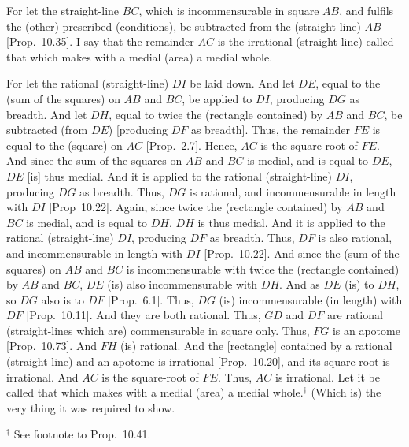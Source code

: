 \begin{Parallel}{}{}
{\epsfysize=1.7in 
\centerline{}

For let the straight-line $BC$, which is incommensurable in square
$AB$, and fulfils the (other) prescribed (conditions), be subtracted from the
(straight-line) $AB$ [Prop.~10.35].  I say that the remainder $AC$ is the irrational (straight-line) called  that which makes with a medial (area) a medial whole.

For let the rational (straight-line) $DI$ be laid down. And let $DE$, equal to
the (sum of the squares) on $AB$ and $BC$, be applied to $DI$,
producing $DG$ as breadth. And let $DH$, equal to twice the (rectangle
contained) by $AB$ and $BC$, be subtracted (from $DE$) [producing
$DF$ as breadth]. Thus, the remainder $FE$ is equal to the (square) on 
$AC$ [Prop.~2.7]. Hence, $AC$ is the square-root of $FE$. And since the sum of the squares on $AB$ and $BC$ is medial, and
is equal to $DE$, $DE$ [is] thus medial. And it is applied to the
rational (straight-line) $DI$, producing $DG$ as breadth. Thus, $DG$
is rational, and incommensurable in length with $DI$ [Prop~10.22]. Again, since twice the (rectangle
contained) by $AB$ and $BC$ is medial, and is equal to $DH$, $DH$
is thus medial. And it is applied to the rational (straight-line)
$DI$, producing $DF$ as breadth.  Thus, $DF$ is also rational, and incommensurable in length with $DI$ [Prop.~10.22]. And since  the (sum of the squares)
on $AB$ and $BC$ is incommensurable with twice the (rectangle contained)
by $AB$ and $BC$, $DE$ (is) also incommensurable with $DH$. 
And as $DE$ (is) to $DH$, so $DG$  also is to $DF$ [Prop.~6.1]. Thus, $DG$ (is) incommensurable (in length) with
$DF$ [Prop.~10.11]. And they are both rational. 
Thus, $GD$ and $DF$ are rational (straight-lines which are) commensurable
in square only. Thus, $FG$ is an apotome [Prop.~10.73]. And $FH$ (is) rational. And the
[rectangle] contained by a rational (straight-line) and an apotome is
irrational [Prop.~10.20], and its square-root
is irrational. And $AC$ is the square-root of $FE$.  Thus, $AC$
is irrational. Let it be called that which makes with a medial (area) a medial
whole.$^\dag$ 
(Which is) the very thing it was required to show.}
\end{Parallel}
{\footnotesize\noindent$^\dag$ See footnote to Prop.~10.41.}

